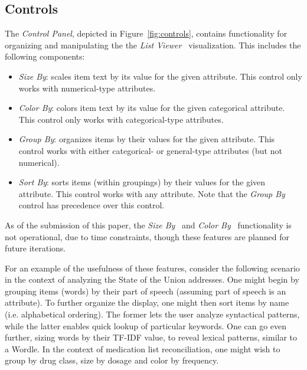 \documentclass{chi2009}
\newcommand{\ListViewer}{\textit{List Viewer}}
\newcommand{\Controls}{\textit{Control Panel}}
\newcommand{\SizeBy}{\textit{Size By}}
\newcommand{\ColorBy}{\textit{Color By}}
\newcommand{\GroupBy}{\textit{Group By}}
\newcommand{\SortBy}{\textit{Sort By}}
\begin{document}
\subsection{Controls}
The \Controls, depicted in Figure~\ref{fig:controls}, contains functionality for organizing and manipulating the the \ListViewer~ visualization. This includes the following components:
\begin{itemize}
\item \SizeBy: scales item text by its value for the given attribute. This control only works with numerical-type attributes.
\item \ColorBy: colors item text by its value for the given categorical attribute. This control only works with categorical-type attributes.
\item \GroupBy: organizes items by their values for the given attribute. This control works with either categorical- or general-type attributes (but not numerical).
\item \SortBy: sorts items (within groupings) by their values for the given attribute. This control works with any attribute. Note that the \GroupBy~ control has precedence over this control.
\end{itemize}
As of the submission of this paper, the \SizeBy~ and \ColorBy~ functionality is not operational, due to time constraints, though these features are planned for future iterations.

For an example of the usefulness of these features, consider the following scenario in the context of analyzing the State of the Union addresses. One might begin by grouping items (words) by their part of speech (assuming part of speech is an attribute). To further organize the display, one might then sort items by name (i.e. alphabetical ordering). The former lets the user analyze syntactical patterns, while the latter enables quick lookup of particular keywords. One can go even further, sizing words by their TF-IDF value, to reveal lexical patterns, similar to a Wordle\cite{Viegas2009}. In the context of medication list reconciliation, one might wish to group by drug class, size by dosage and color by frequency.
 
\end{document}

